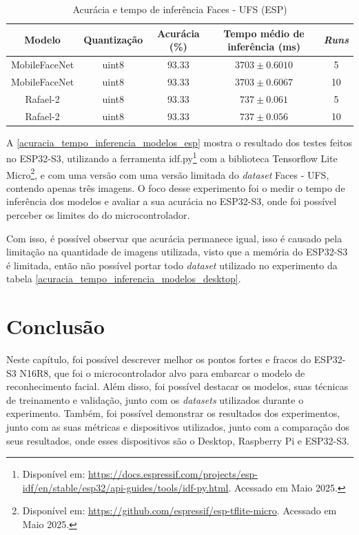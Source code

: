 \begin{table}[htb]
\centering
\ABNTEXfontereduzida
\caption[Acurácia e tempo de inferência (ESP)]{Acurácia e tempo de inferência Faces - UFS (ESP)}
\label{acuracia_tempo_inferencia_modelos_esp}
\begin{tabular}{ |c|c|c|c|c| }
	\hline
	\textbf{Modelo} & \textbf{Quantização} & \textbf{Acurácia (\%)} & \textbf{Tempo médio de inferência (ms)} & \textbf{\textit{Runs}} \\
	\hline
	MobileFaceNet 	&uint8	& 	93.33& $3703 \pm 0.6010$ & 5 \\
	MobileFaceNet 	&uint8	& 	93.33& $3703 \pm 0.6067$ & 10 \\
	Rafael-2	&uint8	& 	93.33& $737 \pm 0.061$ & 5\\
	Rafael-2	&uint8	& 	93.33& $737 \pm 0.056$ & 10\\
	\hline
\end{tabular}
\end{table}

A \autoref{acuracia_tempo_inferencia_modelos_esp} mostra o resultado dos testes feitos no ESP32-S3,
utilizando a ferramenta idf.py\footnote{Disponível em:
\url{https://docs.espressif.com/projects/esp-idf/en/stable/esp32/api-guides/tools/idf-py.html}.
Acessado em Maio 2025.}
com a biblioteca Tensorflow Lite Micro\footnote{Disponível em: \url{
https://github.com/espressif/esp-tflite-micro}. Acessado em Maio 2025.},
e com uma versão com uma versão limitada do \textit{dataset} Faces - UFS, contendo apenas três imagens.
O foco desse experimento foi o medir o tempo de inferência dos modelos e avaliar a sua acurácia
no ESP32-S3, onde foi possível perceber os limites do do microcontrolador.

Com isso, é possível observar que acurácia permanece igual, isso é causado pela limitação na
quantidade de imagens utilizada, visto que a memória do ESP32-S3 é limitada, então não possível
portar todo \textit{dataset} utilizado no experimento da tabela
\autoref{acuracia_tempo_inferencia_modelos_desktop}.


\section{Conclusão}
Neste capítulo, foi possível descrever melhor os pontos fortes e fracos do ESP32-S3 N16R8, que foi o microcontrolador
alvo para embarcar o modelo de reconhecimento facial. Além disso, foi possível destacar os modelos, suas técnicas de
treinamento e validação, junto com os \textit{datasets} utilizados durante o experimento. Também, foi possível demonstrar
os resultados dos experimentos, junto com as suas métricas e dispositivos utilizados, junto com a comparação dos seus
resultados, onde esses dispositivos são o Desktop, Raspberry Pi e ESP32-S3.
